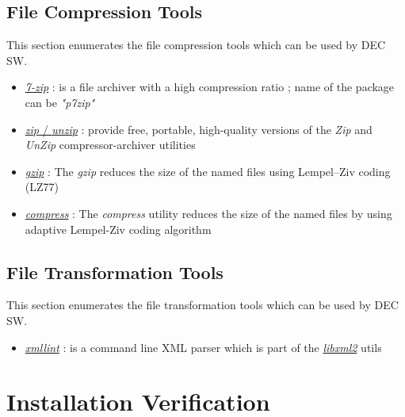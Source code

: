 \documentclass[dec_sum_main.tex]{subfiles}
\begin{document}
\subsection{File Compression Tools}
This section enumerates the file compression tools which can be used by DEC SW.
\par
\begin{itemize}
	\item \href{https://www.7-zip.org/}{\textit{7-zip}} : is a file archiver with a high compression ratio ; name of the package can be \textit{"p7zip"}
	\item \href{http://infozip.sourceforge.net}{\textit{zip} / \textit{unzip}} : provide free, portable, high-quality versions of the \textit{Zip} and \textit{UnZip} compressor-archiver utilities
	\item \href{https://www.gzip.org}{\textit{gzip}} : The \textit{gzip} reduces the size of the named files using Lempel–Ziv coding (LZ77)
	\item \href{http://man7.org/linux/man-pages/man1/compress.1p.html}{\textit{compress}} : The \textit{compress} utility reduces the size of the named files by using adaptive Lempel-Ziv coding algorithm
\end{itemize}

\subsection{File Transformation Tools}
This section enumerates the file transformation tools which can be used by DEC SW.

\begin{itemize}
	\item \href{http://xmlsoft.org/xmllint.html}{\textit{xmllint}} : is a command line XML parser which is part of the \href{http://xmlsoft.org}{\textit{libxml2}} utils
\end{itemize}

\section{Installation Verification}
\end{document}
